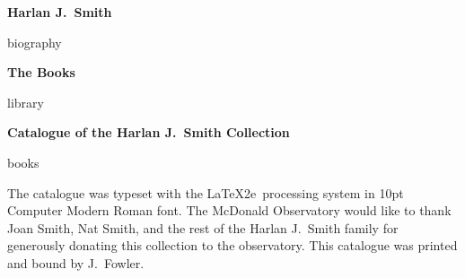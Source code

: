\documentclass[letterpaper]{book}
\begin{document}
\pagestyle{plain}
\vspace*{1 in}
\centerline{\Large \bf Harlan J.\ Smith}
\bigskip\bigskip
{biography}
\newpage

\vspace*{1 in}
\centerline{\Large \bf The Books}
\bigskip\bigskip
{library}
\newpage

\printbibliography

\mainmatter
\begin{center}
  {\Large \bf Catalogue of the Harlan J.\ Smith Collection}
\end{center}
\bigskip
{books}


\backmatter

  \printindex[author]

\begin{colophon}
  The catalogue was typeset with the \LaTeX2e\ processing system in
  10pt Computer Modern Roman font. The McDonald Observatory would like
  to thank Joan Smith, Nat Smith, and the rest of the Harlan J.~Smith
  family for generously donating this collection to the observatory.
  This catalogue was printed and bound by J.~Fowler.
\end{colophon}
\end{document}
